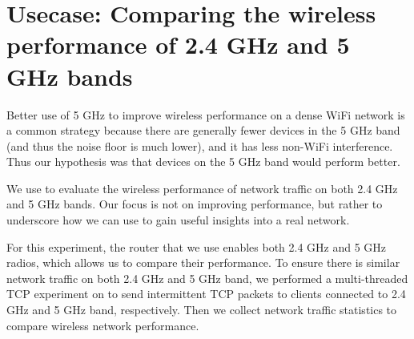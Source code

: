 \section{Usecase: Comparing the wireless performance of 2.4 GHz and 5 GHz bands}
\label{sec.usecase1}

Better use of 5 GHz to improve wireless performance on a dense WiFi network is a common strategy because there are generally fewer devices in the 5 GHz band (and thus the noise floor is much lower), and it has less non-WiFi interference. Thus our hypothesis was that devices on the 5 GHz band would perform better.

We use \sysname to evaluate the wireless performance of network traffic on both 2.4 GHz and 5 GHz bands. Our focus is not on improving performance, but rather to underscore how we can use \sysname to gain useful insights into a real network.

For this experiment, the router that we use enables both 2.4 GHz and 5 GHz radios, which allows us to compare their performance. To ensure there is similar network traffic on both 2.4 GHz and 5 GHz band, we performed a multi-threaded TCP experiment on \sysname to send intermittent TCP packets to clients connected to 2.4 GHz and 5 GHz band, respectively. Then we collect network traffic statistics to compare wireless network performance.

